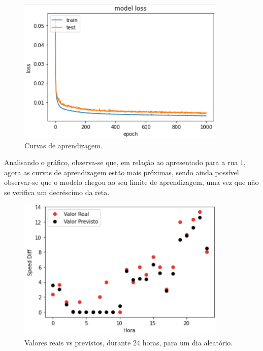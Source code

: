 \documentclass[a4paper, 12pt]{article}
\begin{document}
\begin{figure}[H]
	\centering
	\includegraphics[width=10cm]{resultados/curvas_aprend_2.png}
	\caption{Curvas de aprendizagem.}
\end{figure}

Analisando o gráfico, observa-se que, em relação ao apresentado para a rua $1$, agora as curvas de aprendizagem estão mais próximas, sendo ainda possível observar-se que o modelo chegou ao seu limite de aprendizagem, uma vez que não se verifica um decréscimo da reta.

\begin{figure}[H]
	\centering
	\includegraphics[width=10cm]{resultados/real_prev_2.png}
	\caption{Valores reais vs previstos, durante 24 horas, para um dia aleatório.}
\end{figure}
\end{document}
